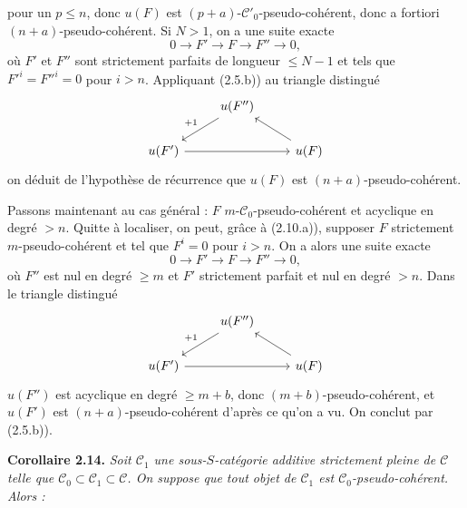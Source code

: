 pour un \(p\leq n\), donc \(u(F)\) est \((p+a)\)-\(\mathcal C'_0\)-pseudo-cohérent, donc a fortiori \((n+a)\)-pseudo-cohérent. Si \(N>1\), on a une suite exacte
\[
  0\longrightarrow F'\longrightarrow F\longrightarrow F''\longrightarrow 0,
\]
où \(F'\) et \(F''\) sont strictement parfaits de longueur \(\leq N-1\) et tels que \(F'^i=F''^i=0\) pour \(i>n\). Appliquant (2.5.b)) au triangle distingué
\[
\begin{tikzcd}
& u(F'') \arrow[dl,"+1"'] & \\
u(F') \arrow[rr] && u(F) \arrow[ul]
\end{tikzcd}
\]
on déduit de l'hypothèse de récurrence que \(u(F)\) est \((n+a)\)-pseudo-cohérent.

Passons maintenant au cas général : \(F\) \(m\)-\(\mathcal C_0\)-pseudo-cohérent et acyclique en degré \(>n\). Quitte à localiser, on peut, grâce à (2.10.a)), supposer \(F\) strictement \(m\)-pseudo-cohérent et tel que \(F^i=0\) pour \(i>n\). On a alors une suite exacte
\[
  0\longrightarrow F'\longrightarrow F\longrightarrow F''\longrightarrow 0,
\]
où \(F''\) est nul en degré \(\geq m\) et \(F'\) strictement parfait et nul en degré \(>n\). Dans le triangle distingué
\[
\begin{tikzcd}
& u(F'') \arrow[dl,"+1"'] & \\
u(F') \arrow[rr] && u(F) \arrow[ul]
\end{tikzcd}
\]
\(u(F'')\) est acyclique en degré \(\geq m+b\), donc \((m+b)\)-pseudo-cohérent, et \(u(F')\) est \((n+a)\)-pseudo-cohérent d'après ce qu'on a vu. On conclut par (2.5.b)).

\textbf{Corollaire 2.14.} \emph{Soit \(\mathcal C_1\) une sous-\(S\)-catégorie additive strictement pleine de \(\mathcal C\) telle que \(\mathcal C_0\subset\mathcal C_1\subset\mathcal C\). On suppose que tout objet de \(\mathcal C_1\) est \(\mathcal C_0\)-pseudo-cohérent. Alors :}

